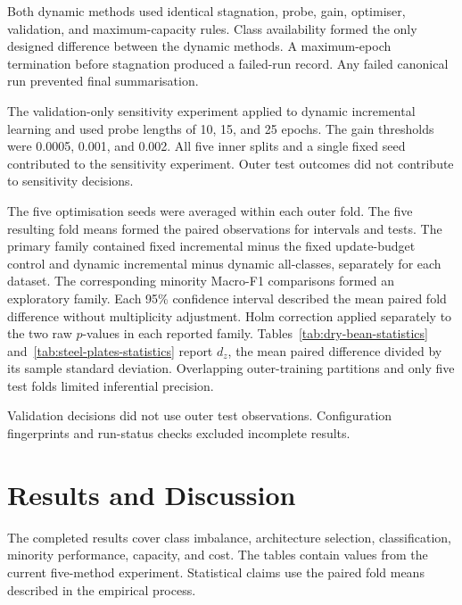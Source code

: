 \documentclass[conference,10pt]{IEEEtran}
\begin{document}
Both dynamic methods used identical stagnation, probe, gain, optimiser, validation, and maximum-capacity rules. Class availability formed the only designed difference between the dynamic methods. A maximum-epoch termination before stagnation produced a failed-run record. Any failed canonical run prevented final summarisation.

The validation-only sensitivity experiment applied to dynamic incremental learning and used probe lengths of 10, 15, and 25 epochs. The gain thresholds were 0.0005, 0.001, and 0.002. All five inner splits and a single fixed seed contributed to the sensitivity experiment. Outer test outcomes did not contribute to sensitivity decisions.

The five optimisation seeds were averaged within each outer fold. The five resulting fold means formed the paired observations for intervals and tests. The primary family contained fixed incremental minus the fixed update-budget control and dynamic incremental minus dynamic all-classes, separately for each dataset. The corresponding minority Macro-F1 comparisons formed an exploratory family. Each 95\% confidence interval described the mean paired fold difference without multiplicity adjustment. Holm correction applied separately to the two raw $p$-values in each reported family. Tables~\ref{tab:dry-bean-statistics} and~\ref{tab:steel-plates-statistics} report $d_z$, the mean paired difference divided by its sample standard deviation. Overlapping outer-training partitions and only five test folds limited inferential precision.

Validation decisions did not use outer test observations. Configuration fingerprints and run-status checks excluded incomplete results.

\section{Results and Discussion}
The completed results cover class imbalance, architecture selection, classification, minority performance, capacity, and cost. The tables contain values from the current five-method experiment. Statistical claims use the paired fold means described in the empirical process.
\end{document}
